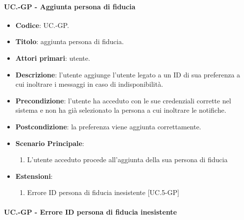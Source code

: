 	\paragraph{UC\theuccount.\thesubuccount-GP - Aggiunta persona di fiducia}
		
		\begin{itemize}
			\item \textbf{Codice}: UC\theuccount.\thesubuccount-GP.
			\item \textbf{Titolo}: aggiunta persona di fiducia.
			\item \textbf{Attori primari}: utente.
			\item \textbf{Descrizione}: l’utente aggiunge l'utente legato a un ID di sua preferenza a cui inoltrare i messaggi in caso di indisponibilità.
			\item \textbf{Precondizione}: l’utente ha acceduto con le sue credenziali corrette nel sistema e non ha già selezionato la persona a cui inoltrare le notifiche.
			\item \textbf{Postcondizione}: la preferenza viene aggiunta correttamente.
			\item \textbf{Scenario Principale}:
			\begin{enumerate}
				\item L'utente acceduto procede all'aggiunta della sua persona di fiducia
			\end{enumerate}
			\item \textbf{Estensioni}:
			\begin{enumerate}
				\item Errore ID persona di fiducia inesistente [UC\theuccount.5-GP]
			\end{enumerate}
		\end{itemize}
	
	\paragraph{UC\theuccount.\thesubuccount-GP - Errore ID persona di fiducia inesistente}
		
